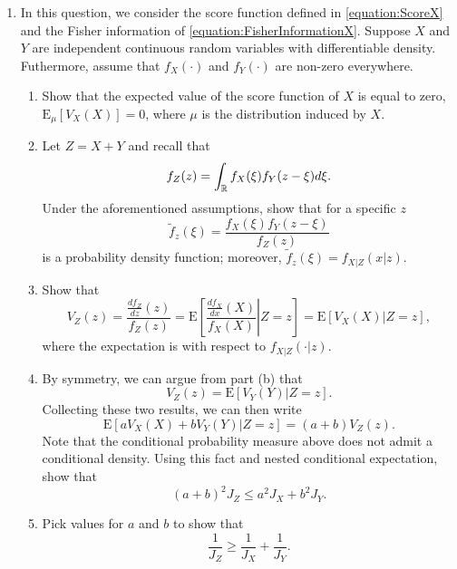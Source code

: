 \begin{enumerate}
\item In this question, we consider the score function defined in \eqref{equation:ScoreX} and the Fisher information of \eqref{equation:FisherInformationX}.
Suppose $X$ and $Y$ are independent continuous random variables with differentiable density.
Futhermore, assume that $f_X(\cdot)$ and $f_Y(\cdot)$ are non-zero everywhere.
\begin{enumerate}
\item Show that the expected value of the score function of $X$ is equal to zero, $\mathrm{E}_{\mu} [V_X(X)] = 0$, where $\mu$ is the distribution induced by $X$.
\item Let $Z = X + Y$ and recall that
\begin{equation*}
f_Z (z) = \int_{\mathbb{R}} f_X (\xi) f_Y (z -\xi) d\xi .
\end{equation*}
Under the aforementioned assumptions, show that for a specific $z$
\begin{equation*}
\tilde{f}_z (\xi) = \frac{f_X (\xi) f_Y (z -\xi)}{f_Z(z)}
\end{equation*}
is a probability density function; moreover, $\tilde{f}_z (\xi) = f_{X | Z} (x | z)$.
\item Show that
\begin{equation*}
V_Z (z) = \frac{\frac{d f_Z}{dz}(z)}{f_Z(z)}
= \mathrm{E} \left[ \left. \frac{\frac{d f_X}{dx}(X)}{f_X(X)} \right| Z = z \right]
= \mathrm{E} \left[ V_X(X) | Z = z \right] ,
\end{equation*}
where the expectation is with respect to $f_{X|Z} (\cdot|z)$.
\item By symmetry, we can argue from part (b) that
\begin{equation*}
V_Z(z) = \mathrm{E} \left[ V_Y(Y) | Z = z \right] .
\end{equation*}
Collecting these two results, we can then write
\begin{equation*}
\mathrm{E} \left[ a V_X(X) + b V_Y(Y) | Z = z \right] = (a + b) V_Z (z) .
\end{equation*}
Note that the conditional probability measure above does not admit a conditional density.
Using this fact and nested conditional expectation, show that
\begin{equation*}
(a + b)^2 J_Z \leq a^2 J_X + b^2 J_Y .
\end{equation*}
\item Pick values for $a$ and $b$ to show that
\begin{equation*}
\frac{1}{J_Z} \geq \frac{1}{J_X} + \frac{1}{J_Y} .
\end{equation*}
\end{enumerate}



\end{enumerate}
